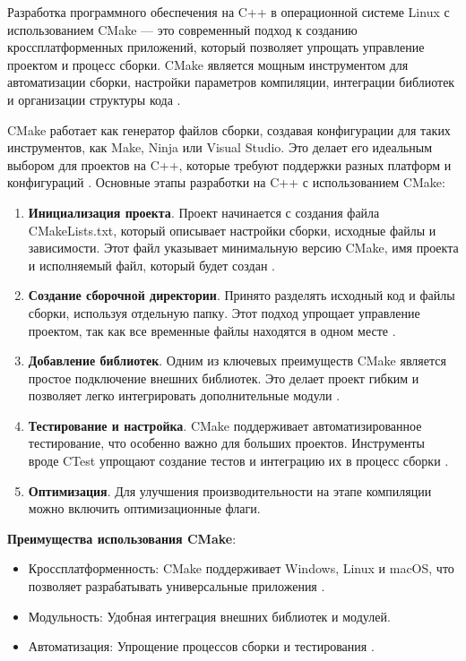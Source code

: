 
Разработка программного обеспечения на C++ в операционной системе Linux с использованием CMake — это современный подход к созданию кроссплатформенных приложений, который позволяет упрощать управление проектом и процесс сборки. CMake является мощным инструментом для автоматизации сборки, настройки параметров компиляции, интеграции библиотек и организации структуры кода \cite{cmake-habr}\cite{cmake-docs}.

CMake работает как генератор файлов сборки, создавая конфигурации для таких инструментов, как Make, Ninja или Visual Studio. Это делает его идеальным выбором для проектов на C++, которые требуют поддержки разных платформ и конфигураций \cite{cmake-docs}.
Основные этапы разработки на C++ с использованием CMake:

\begin{enumerate}
	\item \textbf{Инициализация проекта}. Проект начинается с создания файла CMakeLists.txt, который описывает настройки сборки, исходные файлы и зависимости. Этот файл указывает минимальную версию CMake, имя проекта и исполняемый файл, который будет создан \cite{cmake-docs}.
	
	\item \textbf{Создание сборочной директории}. Принято разделять исходный код и файлы сборки, используя отдельную папку. Этот подход упрощает управление проектом, так как все временные файлы находятся в одном месте \cite{cmake-habr}.
	
	\item \textbf{Добавление библиотек}. Одним из ключевых преимуществ CMake является простое подключение внешних библиотек. Это делает проект гибким и позволяет легко интегрировать дополнительные модули \cite{cmake-docs}.
	
	\item \textbf{Тестирование и настройка}. CMake поддерживает автоматизированное тестирование, что особенно важно для больших проектов. Инструменты вроде CTest упрощают создание тестов и интеграцию их в процесс сборки \cite{cmake-docs}.
	
	\item \textbf{Оптимизация}. Для улучшения производительности на этапе компиляции можно включить оптимизационные флаги.
\end{enumerate}

\textbf{Преимущества использования CMake}:
\begin{itemize}
	\item Кроссплатформенность: CMake поддерживает Windows, Linux и macOS, что позволяет разрабатывать универсальные приложения \cite{cmake-habr}.
	\item Модульность: Удобная интеграция внешних библиотек и модулей.
	\item Автоматизация: Упрощение процессов сборки и тестирования \cite{cmake-docs}.
\end{itemize}

\clearpage
